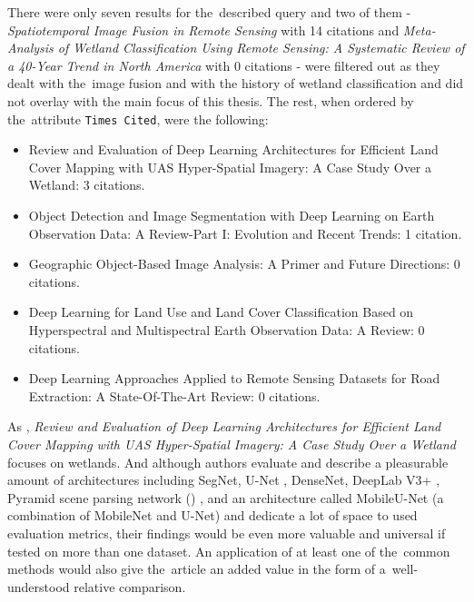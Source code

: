 \noindent There were only seven results for the~described query and two of them - \textit{Spatiotemporal Image Fusion in Remote Sensing} \cite{review-st-fusion} with 14 citations and \textit{Meta-Analysis of Wetland Classification Using Remote Sensing: A Systematic Review of a 40-Year Trend in North America} \cite{review-wetlands-40-years} with 0 citations - were filtered out as they dealt with the~image fusion and with the history of wetland classification and did not overlay with the main focus of this thesis. The rest, when ordered by the~attribute \verb|Times Cited|, were the following:

\begin{itemize}
	\item Review and Evaluation of Deep Learning Architectures for Efficient Land Cover Mapping with UAS Hyper-Spatial Imagery: A Case Study Over a Wetland: 3 citations. \cite{review-dl-wetlands}
	\item Object Detection and Image Segmentation with Deep Learning on Earth Observation Data: A Review-Part I: Evolution and Recent Trends: 1 citation. \cite{review-dl-eo}
	\item Geographic Object-Based Image Analysis: A Primer and Future Directions: 0 citations. \cite{geobia}
	\item Deep Learning for Land Use and Land Cover Classification Based on Hyperspectral and Multispectral Earth Observation Data: A Review: 0 citations. \cite{review-dl-lulc}
	\item Deep Learning Approaches Applied to Remote Sensing Datasets for Road Extraction: A State-Of-The-Art Review: 0 citations. \cite{review-dl-road-extraction}
\end{itemize}

As \cite{very-deep-cnn-lc}, \textit{Review and Evaluation of Deep Learning Architectures for Efficient Land Cover Mapping with UAS Hyper-Spatial Imagery: A Case Study Over a Wet\-land} focuses on wetlands. And although authors evaluate and describe a pleasurable amount of architectures including SegNet, U-Net \cite{u-net}, DenseNet, DeepLab V3+ \cite{deeplab}, Pyramid scene parsing network () \cite{pspnet}, and an architecture called MobileU-Net (a combination of MobileNet \cite{mobilenet} and U-Net) and dedicate a lot of space to used evaluation metrics, their findings would be even more valuable and universal if tested on more than one dataset. An application of at least one of the~common  methods would also give the~article an added value in the form of a~well-understood relative comparison.

